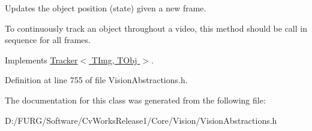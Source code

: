 Updates the object position (state) given a new frame. 

To continuously track an object throughout a video, this method should be call in sequence for all frames. 

Implements \hyperlink{class_vision_core_1_1_interfaces_1_1_tracker_aa298892351b5377fcdc227b6d53daf69}{Tracker$<$ T\+Img, T\+Obj $>$}.



Definition at line 755 of file Vision\+Abstractions.\+h.



The documentation for this class was generated from the following file\+:\begin{DoxyCompactItemize}
\item 
D\+:/\+F\+U\+R\+G/\+Software/\+Cv\+Works\+Release1/\+Core/\+Vision/Vision\+Abstractions.\+h\end{DoxyCompactItemize}
